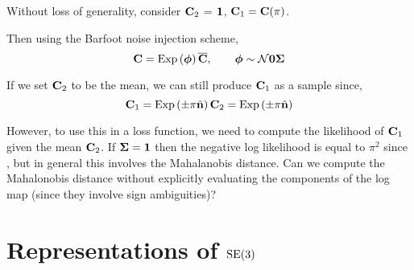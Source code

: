 Without loss of generality, consider $\boldsymbol{\mathbf{C}}_2$ = $\boldsymbol{\mathbf{1}}$, $\boldsymbol{\mathbf{C}}_1 = \boldsymbol{\mathbf{C}}(\pi)$. 

Then using the Barfoot noise injection scheme,
\begin{equation}
\boldsymbol{\mathbf{C}} = \mathrm{Exp}\left({\boldsymbol{\mathbf{\phi}}}\right) \boldsymbol{\mathbf{\overline{C}}}, \quad\quad \boldsymbol{\mathbf{\phi}} \sim \mathcal{N}{\boldsymbol{\mathbf{0}}}{\boldsymbol{\mathbf{\Sigma}}}
\end{equation}

If we set $\boldsymbol{\mathbf{C}}_2$ to be the mean, we can still produce $\boldsymbol{\mathbf{C}}_1$ as a sample since,
\begin{equation}
\boldsymbol{\mathbf{C}}_1 = \mathrm{Exp}\left({\pm\pi \hat{\boldsymbol{\mathbf{n}}}}\right) \boldsymbol{\mathbf{C}}_2 =  \mathrm{Exp}\left({\pm\pi \hat{\boldsymbol{\mathbf{n}}}}\right) 
\end{equation}

However, to use this in a loss function, we need to compute the likelihood of $\boldsymbol{\mathbf{C}}_1$ given the mean $\boldsymbol{\mathbf{C}}_2$. If $\boldsymbol{\mathbf{\Sigma}} = \boldsymbol{\mathbf{1}}$ then the negative log likelihood is equal to $\pi^2$ since , but in general this involves the Mahalanobis distance. Can we compute the Mahalonobis distance without explicitly evaluating the components of the log map (since they involve sign ambiguities)?



\chapter{Representations of $\mathrm{SE}(3)$}
\label{chap:appendix_se3}
 \\
